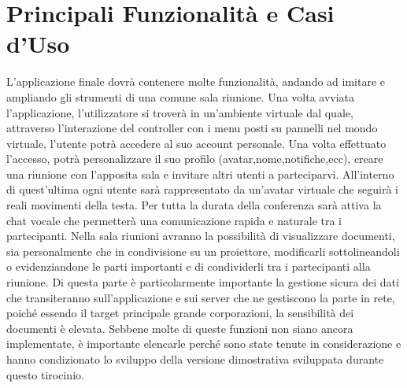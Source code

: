 \section{Principali Funzionalità e Casi d'Uso}
L'applicazione finale dovrà contenere molte funzionalità, andando ad imitare e ampliando gli strumenti di una comune sala riunione. Una volta avviata l'applicazione, l'utilizzatore si troverà in un'ambiente virtuale dal quale, attraverso l'interazione del controller con i menu posti su pannelli nel mondo virtuale, l'utente potrà accedere al suo account personale. Una volta effettuato l'accesso, potrà personalizzare il suo profilo (avatar,nome,notifiche,ecc), creare una riunione con l'apposita sala e invitare altri utenti a parteciparvi. All'interno di quest'ultima ogni utente sarà rappresentato da un'avatar virtuale che seguirà i reali movimenti della testa. Per tutta la durata della conferenza sarà attiva la chat vocale che permetterà una comunicazione rapida e naturale tra i partecipanti.  Nella sala riunioni avranno la possibilità di visualizzare documenti, sia personalmente che in condivisione su un proiettore, modificarli sottolineandoli o evidenziandone le parti importanti e di condividerli tra i partecipanti alla riunione. Di questa parte è particolarmente importante la gestione sicura dei dati che transiteranno sull'applicazione e sui server che ne gestiscono la parte in rete, poiché essendo il target principale grande corporazioni, la sensibilità dei documenti è elevata. Sebbene molte di queste funzioni non siano ancora implementate, è importante elencarle perché sono state tenute in considerazione e hanno condizionato lo sviluppo della versione dimostrativa sviluppata durante questo tirocinio.\\

